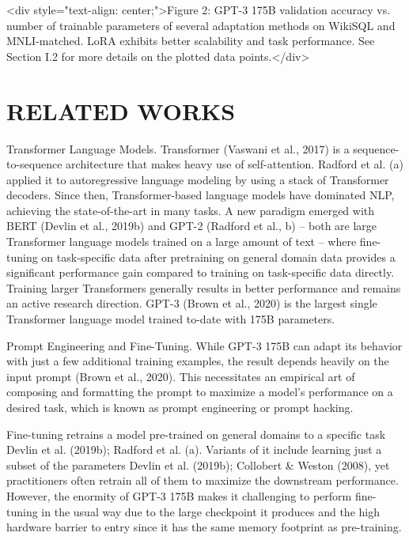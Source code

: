 \documentclass[conference]{IEEEtran}
\begin{document}
\textless{}div style="text-align: center;"\textgreater{}Figure 2: GPT-3 175B validation accuracy vs. number of trainable parameters of several adaptation methods on WikiSQL and MNLI-matched. LoRA exhibits better scalability and task performance. See Section I.2 for more details on the plotted data points.\textless{}/div\textgreater{}




\section{RELATED WORKS}

Transformer Language Models. Transformer (Vaswani et al., 2017) is a sequence-to-sequence architecture that makes heavy use of self-attention. Radford et al. (a) applied it to autoregressive language modeling by using a stack of Transformer decoders. Since then, Transformer-based language models have dominated NLP, achieving the state-of-the-art in many tasks. A new paradigm emerged with BERT (Devlin et al., 2019b) and GPT-2 (Radford et al., b) – both are large Transformer language models trained on a large amount of text – where fine-tuning on task-specific data after pretraining on general domain data provides a significant performance gain compared to training on task-specific data directly. Training larger Transformers generally results in better performance and remains an active research direction. GPT-3 (Brown et al., 2020) is the largest single Transformer language model trained to-date with 175B parameters.

Prompt Engineering and Fine-Tuning. While GPT-3 175B can adapt its behavior with just a few additional training examples, the result depends heavily on the input prompt (Brown et al., 2020). This necessitates an empirical art of composing and formatting the prompt to maximize a model's performance on a desired task, which is known as prompt engineering or prompt hacking.

Fine-tuning retrains a model pre-trained on general domains to a specific task Devlin et al. (2019b); Radford et al. (a). Variants of it include learning just a subset of the parameters Devlin et al. (2019b); Collobert \& Weston (2008), yet practitioners often retrain all of them to maximize the downstream performance. However, the enormity of GPT-3 175B makes it challenging to perform fine-tuning in the usual way due to the large checkpoint it produces and the high hardware barrier to entry since it has the same memory footprint as pre-training.
\end{document}
